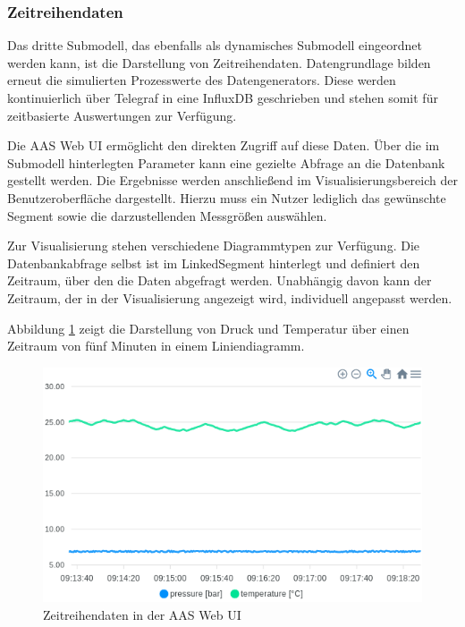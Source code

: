 \subsubsection*{Zeitreihendaten}
\vspace{-0.5em}
Das dritte Submodell, das ebenfalls als dynamisches Submodell eingeordnet werden kann, ist die Darstellung von Zeitreihendaten. 
Datengrundlage bilden erneut die simulierten Prozesswerte des Datengenerators.
Diese werden kontinuierlich über Telegraf in eine InfluxDB geschrieben und stehen somit für zeitbasierte Auswertungen zur Verfügung.

Die AAS Web UI ermöglicht den direkten Zugriff auf diese Daten. 
Über die im Submodell hinterlegten Parameter kann eine gezielte Abfrage an die Datenbank gestellt werden. 
Die Ergebnisse werden anschließend im Visualisierungsbereich der Benutzeroberfläche dargestellt. 
Hierzu muss ein Nutzer lediglich das gewünschte Segment sowie die darzustellenden Messgrößen auswählen.


Zur Visualisierung stehen verschiedene Diagrammtypen zur Verfügung. 
Die Datenbankabfrage selbst ist im LinkedSegment hinterlegt und definiert den Zeitraum, über den die Daten abgefragt werden.
Unabhängig davon kann der Zeitraum, der in der Visualisierung angezeigt wird, individuell angepasst werden.

Abbildung \ref{fig:LiniendiagrammBaSyx} zeigt die Darstellung von Druck und Temperatur über einen Zeitraum von fünf Minuten in einem Liniendiagramm.

\begin{figure}[htbp]
    \centering
        \includegraphics{Bilder/Ergebnisse/DynamischeDaten/ZeitreihenDaten/Liniendiagramm.png}
    \caption{Zeitreihendaten in der AAS Web UI}
    \label{fig:LiniendiagrammBaSyx}
\end{figure}

